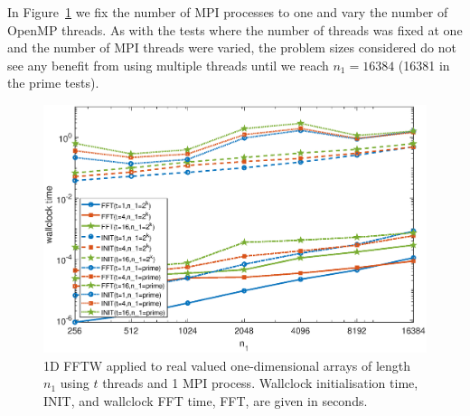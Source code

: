 \documentclass[a4]{article}
\begin{document}
In Figure~\ref{Fig:fftw1d_threads_times} we fix the number of MPI processes to one and vary the number of OpenMP threads. As with the tests where the number of threads was fixed at one and the number of MPI threads were varied, the problem sizes considered do not see any benefit from using multiple threads until we reach $n_1=16384$ (16381 in the prime tests). 


\begin{figure}[!htbp]
\begin{center}
 \includegraphics[width=.9\textwidth, height=0.42\textheight]{FFTW1D_threads_times_fig.eps}
\caption{1D FFTW applied to real valued one-dimensional arrays of length $n_1$ using $t$ threads and 1 MPI process. Wallclock initialisation time, INIT, and wallclock FFT time, FFT, are given in seconds.}
\label{Fig:fftw1d_threads_times}
\end{center}
\end{figure}
\end{document}
